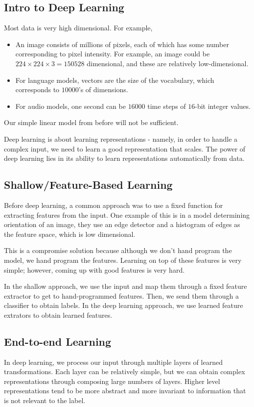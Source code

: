 \documentclass[11pt]{scrartcl}
\newcommand{\1}{\textbf{1}} %
\begin{document}
\subsection{Intro to Deep Learning}
Most data is very high dimensional.  For example,
\begin{itemize}
\item  An image consists of millions of pixels, each of which has some number corresponding to pixel intensity.  For example, an image could be $224 \times 224 \times 3 = 150528$ dimensional, and these are relatively low-dimensional.
\item For language models, vectors are the size of the vocabulary, which corresponds to $10000$'s of dimensions.
\item For audio models, one second can be $16000$ time steps of $16$-bit integer values.  
\end{itemize}
Our simple linear model from before will not be sufficient.

Deep learning is about learning representations - namely, in order to handle a complex input, we need to learn a good representation that scales.  The power of deep learning lies in its ability to learn representations automatically from data.

\subsection{Shallow/Feature-Based Learning}
Before deep learning, a common approach was to use a fixed function for extracting features from the input. One example of this is in a model determining orientation of an image, they use an edge detector and a histogram of edges as the feature space, which is low dimensional.  

This is a compromise solution because although we don't hand program the model, we hand program the features.  Learning on top of these features is very simple; however, coming up with good features is very hard. 

In the shallow approach, we use the input and map them through a fixed feature extractor to get to hand-programmed features.  Then, we send them through a classifier to obtain labels.  In the deep learning approach, we use learned feature extrators to obtain learned features.  

\subsection{End-to-end Learning}
In deep learning, we process our input through multiple layers of learned transformations.  Each layer can be relatively simple, but we can obtain complex representations through composing large numbers of layers.  Higher level representations tend to be more abstract and more invariant to information that is not relevant to the label. 
\end{document}
